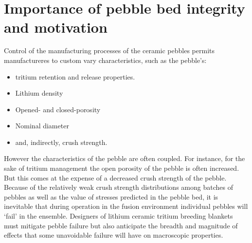 \section{Importance of pebble bed integrity and motivation}\label{sec:intro-bed-integrity}


Control of the manufacturing processes of the ceramic pebbles permits manufactureres to custom vary characteristics, such as the pebble's:
\begin{itemize}
\item tritium retention and release properties.
\item Lithium density
\item Opened- and closed-porosity
\item Nominal diameter
\item and, indirectly, crush strength. 
\end{itemize}
However the characteristics of the pebble are often coupled. For instance, for the sake of tritium management the open porosity of the pebble is often increased. But this comes at the expense of a decreased crush strength of the pebble. Because of the relatively weak crush strength distributions among batches of pebbles as well as the value of stresses predicted in the pebble bed, it is inevitable that during operation in the fusion environment individual pebbles will `fail' in the ensemble. Designers of lithium ceramic tritium breeding blankets must mitigate pebble failure but also anticipate the breadth and magnitude of effects that some unavoidable failure will have on macroscopic properties.

